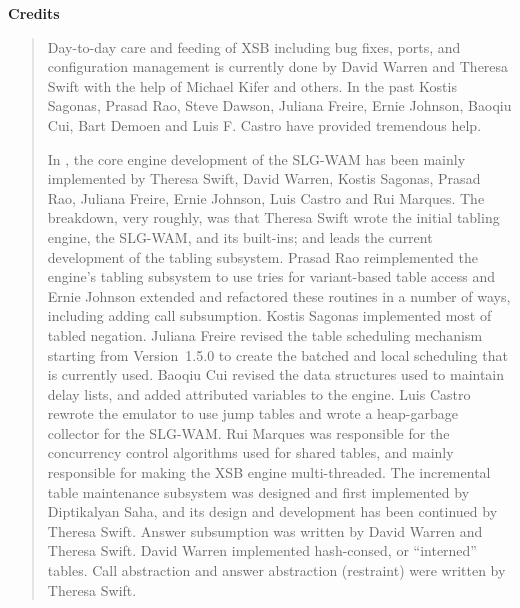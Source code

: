 \begin{center}
{\bf {\Large 
		Credits
}}
\end{center}


\begin{quote}
Day-to-day care and feeding of XSB including bug fixes, ports, and
configuration management is currently done by David Warren and
Theresa Swift with the help of Michael Kifer and others.  In the past
Kostis Sagonas, Prasad Rao, Steve Dawson, Juliana Freire, Ernie
Johnson, Baoqiu Cui, Bart Demoen and Luis F.  Castro have provided
tremendous help.

In \version, the core engine development of the SLG-WAM has been
mainly implemented by Theresa Swift, David Warren, Kostis Sagonas,
Prasad Rao, Juliana Freire, Ernie Johnson, Luis Castro and Rui
Marques.  The breakdown, very roughly, was that Theresa Swift wrote
the initial tabling engine, the SLG-WAM, and its built-ins; and leads
the current development of the tabling subsystem.  Prasad Rao
reimplemented the engine's tabling subsystem to use tries for
variant-based table access and Ernie Johnson extended and refactored
these routines in a number of ways, including adding call subsumption.
Kostis Sagonas implemented most of tabled negation.  Juliana Freire
revised the table scheduling mechanism starting from Version~1.5.0 to
create the batched and local scheduling that is currently used.
Baoqiu Cui revised the data structures used to maintain delay lists,
and added attributed variables to the engine.  Luis Castro rewrote the
emulator to use jump tables and wrote a heap-garbage collector for the
SLG-WAM.  Rui Marques was responsible for the concurrency control
algorithms used for shared tables, and mainly responsible for making
the XSB engine multi-threaded.  The incremental table maintenance
subsystem was designed and first implemented by Diptikalyan Saha, and
its design and development has been continued by Theresa Swift.
Answer subsumption was written by David Warren and Theresa Swift.
David Warren implemented hash-consed, or ``interned'' tables.  Call
abstraction and answer abstraction (restraint) were written by
Theresa Swift.


\end{quote}

